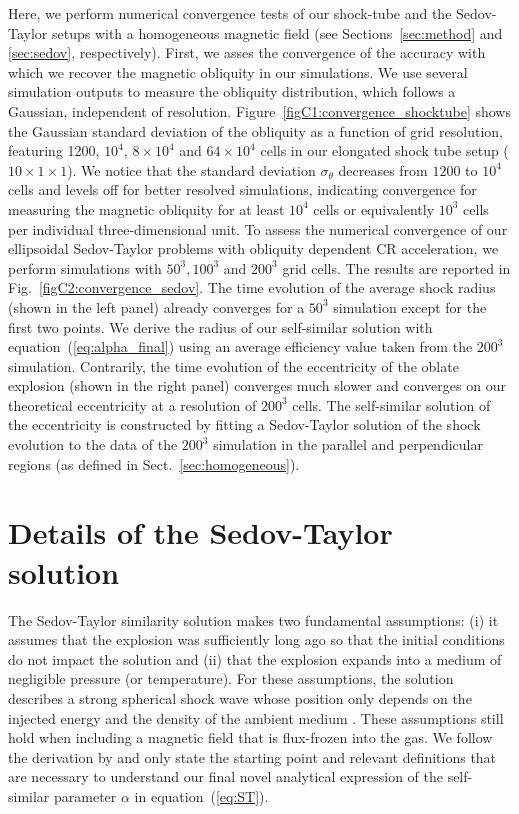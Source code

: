 \documentclass[8pt,a4paper,usenatbib]{mnras}
\begin{document}
Here, we perform numerical convergence tests of our shock-tube and the
Sedov-Taylor setups with a homogeneous magnetic field (see
Sections~\ref{sec:method} and \ref{sec:sedov}, respectively).  First, we asses
the convergence of the accuracy with which we recover the magnetic obliquity in
our simulations. We use several simulation outputs to measure the obliquity
distribution, which follows a Gaussian, independent of resolution.
Figure~\ref{figC1:convergence_shocktube} shows the Gaussian standard deviation
of the obliquity as a function of grid resolution, featuring 1200, $10^4$, $8
\times 10^4$ and $64 \times 10^4$ cells in our elongated shock tube setup
($10\times1\times1$).  We notice that the standard deviation $\sigma_\theta$
decreases from $1200$ to $10^4$ cells and levels off for better resolved
simulations, indicating convergence for measuring the magnetic obliquity for at
least $10^4$ cells or equivalently $10^3$ cells per individual three-dimensional
unit.  To assess the numerical convergence of our ellipsoidal Sedov-Taylor
problems with obliquity dependent CR acceleration, we perform simulations with
$50^3, 100^3 $ and $200^3$ grid cells. The results are reported in
Fig.~\ref{figC2:convergence_sedov}.  The time evolution of the average shock
radius (shown in the left panel) already converges for a $50^3$ simulation
except for the first two points. We derive the radius of our self-similar
solution with equation~(\ref{eq:alpha_final}) using an average efficiency value
taken from the $200^3$ simulation. Contrarily, the time evolution of the
eccentricity of the oblate explosion (shown in the right panel) converges much
slower and converges on our theoretical eccentricity at a resolution of $200^3$
cells. The self-similar solution of the eccentricity is constructed by fitting a
Sedov-Taylor solution of the shock evolution to the data of the $200^3$
simulation in the parallel and perpendicular regions (as defined in
Sect.~\ref{sec:homogeneous}).


\section{Details of the Sedov-Taylor solution}
\label{sec:ST_analytics}

The Sedov-Taylor similarity solution makes two fundamental assumptions: (i) it
assumes that the explosion was sufficiently long ago so that the initial
conditions do not impact the solution and (ii) that the explosion expands into a
medium of negligible pressure (or temperature). For these assumptions, the
solution describes a strong spherical shock wave whose position only depends on
the injected energy and the density of the ambient medium
\citep{1959sdmm.book.....S,1950RSPSA.201..159T}. These assumptions still hold
when including a magnetic field that is flux-frozen into the gas. We follow the
derivation by \citet{1966hydr.book.....L} and only state the starting point and
relevant definitions that are necessary to understand our final novel analytical
expression of the self-similar parameter $\alpha$ in equation~(\ref{eq:ST}).
\end{document}
